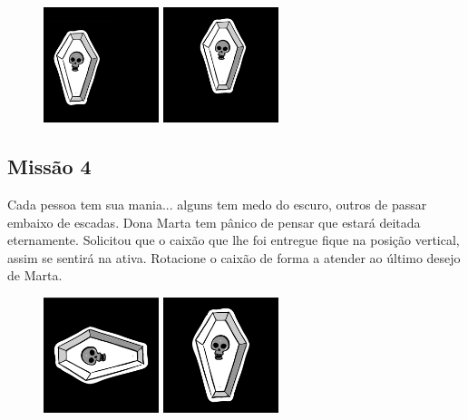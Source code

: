 \documentclass[
	12pt,				%
	oneside,			%
	a4paper,			%
	english,			%
	french,				%
	spanish,			%
	brazil,				%
	]{abntex2}
\begin{document}
\begin{apendicesenv}
\begin{figure}[ht]
\centering
\includegraphics[width=0.3\textwidth]{imagens/desafios/coffin2d00.jpg}
\includegraphics[width=0.3\textwidth]{imagens/desafios/mission3.png}
\end{figure}

\subsection{Missão 4}

Cada pessoa tem sua mania... alguns tem medo do escuro, outros de passar embaixo de escadas. Dona Marta tem pânico de pensar que estará deitada eternamente. Solicitou que o caixão que lhe foi entregue fique na posição vertical, assim se sentirá na ativa. Rotacione o caixão de forma a atender ao último desejo de Marta.

\begin{figure}[H]
\centering
\includegraphics[width=0.3\textwidth]{imagens/desafios/coffin2dhorizon.jpg}
\includegraphics[width=0.3\textwidth]{imagens/desafios/mission4.png}
\end{figure}


\end{apendicesenv}
\end{document}
